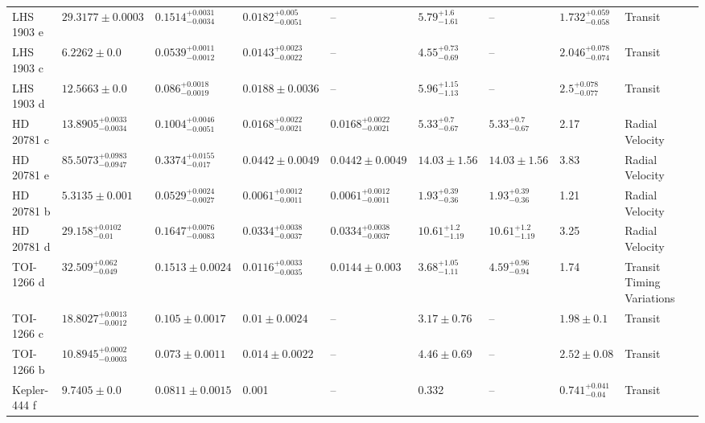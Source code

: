 \begin{tabular}{llllllllll}
LHS 1903 e & $29.3177 \pm 0.0003$ & $0.1514^{+0.0031}_{-0.0034}$ & $0.0182^{+0.005}_{-0.0051}$ & -- & $5.79^{+1.6}_{-1.61}$ & -- & $1.732^{+0.059}_{-0.058}$ & Transit & \cite{WILSON_ET_AL_2026} \\
LHS 1903 c & $6.2262 \pm 0.0$ & $0.0539^{+0.0011}_{-0.0012}$ & $0.0143^{+0.0023}_{-0.0022}$ & -- & $4.55^{+0.73}_{-0.69}$ & -- & $2.046^{+0.078}_{-0.074}$ & Transit & \cite{WILSON_ET_AL_2026} \\
LHS 1903 d & $12.5663 \pm 0.0$ & $0.086^{+0.0018}_{-0.0019}$ & $0.0188 \pm 0.0036$ & -- & $5.96^{+1.15}_{-1.13}$ & -- & $2.5^{+0.078}_{-0.077}$ & Transit & \cite{WILSON_ET_AL_2026} \\
HD 20781 c & $13.8905^{+0.0033}_{-0.0034}$ & $0.1004^{+0.0046}_{-0.0051}$ & $0.0168^{+0.0022}_{-0.0021}$ & $0.0168^{+0.0022}_{-0.0021}$ & $5.33^{+0.7}_{-0.67}$ & $5.33^{+0.7}_{-0.67}$ & 2.17 & Radial Velocity & \cite{UDRY_ET_AL__2019} \\
HD 20781 e & $85.5073^{+0.0983}_{-0.0947}$ & $0.3374^{+0.0155}_{-0.017}$ & $0.0442 \pm 0.0049$ & $0.0442 \pm 0.0049$ & $14.03 \pm 1.56$ & $14.03 \pm 1.56$ & 3.83 & Radial Velocity & \cite{UDRY_ET_AL__2019} \\
HD 20781 b & $5.3135 \pm 0.001$ & $0.0529^{+0.0024}_{-0.0027}$ & $0.0061^{+0.0012}_{-0.0011}$ & $0.0061^{+0.0012}_{-0.0011}$ & $1.93^{+0.39}_{-0.36}$ & $1.93^{+0.39}_{-0.36}$ & 1.21 & Radial Velocity & \cite{UDRY_ET_AL__2019} \\
HD 20781 d & $29.158^{+0.0102}_{-0.01}$ & $0.1647^{+0.0076}_{-0.0083}$ & $0.0334^{+0.0038}_{-0.0037}$ & $0.0334^{+0.0038}_{-0.0037}$ & $10.61^{+1.2}_{-1.19}$ & $10.61^{+1.2}_{-1.19}$ & 3.25 & Radial Velocity & \cite{UDRY_ET_AL__2019} \\
TOI-1266 d & $32.509^{+0.062}_{-0.049}$ & $0.1513 \pm 0.0024$ & $0.0116^{+0.0033}_{-0.0035}$ & $0.0144 \pm 0.003$ & $3.68^{+1.05}_{-1.11}$ & $4.59^{+0.96}_{-0.94}$ & 1.74 & Transit Timing Variations & \cite{GREKLEK_MCKEON_ET_AL_2025} \\
TOI-1266 c & $18.8027^{+0.0013}_{-0.0012}$ & $0.105 \pm 0.0017$ & $0.01 \pm 0.0024$ & -- & $3.17 \pm 0.76$ & -- & $1.98 \pm 0.1$ & Transit & \cite{GREKLEK_MCKEON_ET_AL_2025} \\
TOI-1266 b & $10.8945^{+0.0002}_{-0.0003}$ & $0.073 \pm 0.0011$ & $0.014 \pm 0.0022$ & -- & $4.46 \pm 0.69$ & -- & $2.52 \pm 0.08$ & Transit & \cite{GREKLEK_MCKEON_ET_AL_2025} \\
Kepler-444 f & $9.7405 \pm 0.0$ & $0.0811 \pm 0.0015$ & 0.001 & -- & 0.332 & -- & $0.741^{+0.041}_{-0.04}$ & Transit & \cite{CAMPANTE_ET_AL__2015} \\

\end{tabular}
